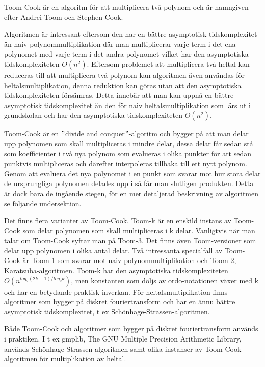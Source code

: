 Toom-Cook är en algoritm för att multiplicera två polynom och är namngiven
efter Andrei Toom och Stephen Cook.

Algoritmen är intressant eftersom den har en bättre asymptotisk tidskomplexitet
än naiv polynommultiplikation där man multiplicerar varje term i det ena
polynomet med varje term i det andra polynomet vilket har den asymptotiska
tidskomplexiteten $O\left(n^2\right)$. Eftersom problemet att multiplicera två
heltal kan reduceras till att multiplicera två polynom kan algoritmen även
användas för heltalsmultiplikation, denna reduktion kan göras utan att den
asymptotiska tidskomplexiteten försämras. Detta innebär att man kan uppnå en
bättre asymptotisk tidskomplexitet än den för naiv heltalsmultiplikation som
lärs ut i grundskolan och har den asymptotiska tidskomplexiteten
$O\left(n^2\right)$.

Toom-Cook är en $"$divide and conquer$"$-algoritm och bygger på att man delar
upp polynomen som skall multipliceras i mindre delar, dessa delar får sedan stå
som koefficienter i två nya polynom som evalueras i olika punkter för att sedan
punktvis multipliceras och därefter interpoleras tillbaka till ett nytt
polynom. Genom att evaluera det nya polynomet i en punkt som svarar mot hur
stora delar de ursprungliga polynomen delades upp i så får man slutligen
produkten. Detta är dock bara de ingående stegen, för en mer detaljerad
beskrivning av algoritmen se följande undersektion.

Det finns flera varianter
av Toom-Cook. Toom-k är en enskild instans av Toom-Cook som delar polynomen som
skall multipliceras i k delar. Vanligtvis när man talar om Toom-Cook syftar man
på Toom-3. Det finns även Toom-versioner som delar upp polynomen i olika antal
delar. Två intressanta specialfall av Toom-Cook är Toom-1 som svarar mot naiv
polynommultiplikation och Toom-2, Karatsuba-algoritmen. Toom-k har den
asymptotiska tidskomplexiteten $O(n^{log_2(2 k-1)/log_2 k})$, men konstanten
som döljs av ordo-notationen växer med k och har en betydande praktisk
inverkan. För heltalsmultiplikation finns algoritmer som bygger på diskret
fouriertransform och har en ännu bättre asymptotisk tidskomplexitet, t ex
Schönhage-Strassen-algoritmen.

Både Toom-Cook och algoritmer som bygger på diskret fouriertransform används i
praktiken. I t ex gmplib, The GNU Multiple Precision Arithmetic Library,
används Schönhage-Strassen-algoritmen samt olika instanser av
Toom-Cook-algoritmen för multiplikation av heltal.
